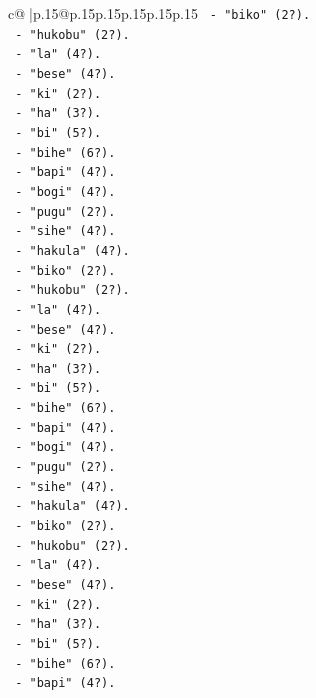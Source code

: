 \documentclass{article}
\begin{document}
{\begin{supertabular}{c@{$\;$}|p{.15\linewidth}@{}p{.15\linewidth}p{.15\linewidth}p{.15\linewidth}p{.15\linewidth}p{.15\linewidth}}
{{{\texttt{       {-} "biko" (2?).} \\
\texttt{       {-} "hukobu" (2?).} \\
\texttt{       {-} "la" (4?).} \\
\texttt{       {-} "bese" (4?).} \\
\texttt{       {-} "ki" (2?).} \\
\texttt{       {-} "ha" (3?).} \\
\texttt{       {-} "bi" (5?).} \\
\texttt{       {-} "bihe" (6?).} \\
\texttt{       {-} "bapi" (4?).} \\
\texttt{       {-} "bogi" (4?).} \\
\texttt{       {-} "pugu" (2?).} \\
\texttt{       {-} "sihe" (4?).} \\
\texttt{       {-} "hakula" (4?).} \\
\texttt{       {-} "biko" (2?).} \\
\texttt{       {-} "hukobu" (2?).} \\
\texttt{       {-} "la" (4?).} \\
\texttt{       {-} "bese" (4?).} \\
\texttt{       {-} "ki" (2?).} \\
\texttt{       {-} "ha" (3?).} \\
\texttt{       {-} "bi" (5?).} \\
\texttt{       {-} "bihe" (6?).} \\
\texttt{       {-} "bapi" (4?).} \\
\texttt{       {-} "bogi" (4?).} \\
\texttt{       {-} "pugu" (2?).} \\
\texttt{       {-} "sihe" (4?).} \\
\texttt{       {-} "hakula" (4?).} \\
\texttt{       {-} "biko" (2?).} \\
\texttt{       {-} "hukobu" (2?).} \\
\texttt{       {-} "la" (4?).} \\
\texttt{       {-} "bese" (4?).} \\
\texttt{       {-} "ki" (2?).} \\
\texttt{       {-} "ha" (3?).} \\
\texttt{       {-} "bi" (5?).} \\
\texttt{       {-} "bihe" (6?).} \\
\texttt{       {-} "bapi" (4?).} \\
}}}
\end{supertabular}}
\end{document}
